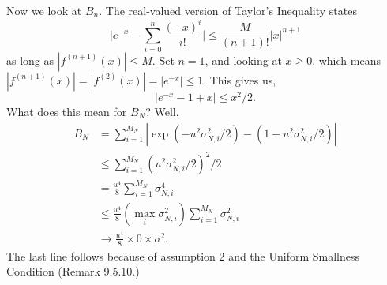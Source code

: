 \documentclass{article}
\begin{document}
Now we look at $B_n$. The real-valued version of Taylor's Inequality states
\[
\bigg\rvert e^{-x} - \sum_{i=0}^n \frac{(-x)^i}{i!}\bigg\rvert \le \frac{M}{(n+1)!} | x|^{n+1}
\]
as long as $|f^{(n+1)}(x)| \le M$. Set $n=1$, and looking at $x \ge 0$, which means $|f^{(n+1)}(x)| = |f^{(2)}(x)| = |e^{-x}| \le 1$. This gives us, 
\[
|e^{-x} - 1 + x  | \le x^2/2.
\]
What does this mean for $B_N$? Well,
\begin{align*}
B_N &= \sum_{i=1}^{M_N} |\exp(-u^2 \sigma^2_{N,i}/2) - (1-u^2 \sigma^2_{N,i}/2)| \tag{defn.} \\
&\le \sum_{i=1}^{M_N} \left(u^2 \sigma^2_{N,i}/2 \right)^2/2 \tag{real-valued Taylor's}\\
&= \frac{u^4}{8} \sum_{i=1}^{M_N} \sigma^4_{N,i} \\
&\le \frac{u^4}{8} \left(\max_i \sigma^2_{N,i} \right)\sum_{i=1}^{M_N} \sigma^2_{N,i} \tag{see below} \\
&\to \frac{u^4}{8} \times 0 \times \sigma^2.
\end{align*}
The last line follows because of assumption 2 and the Uniform Smallness Condition (Remark 9.5.10.) 
\end{document}
